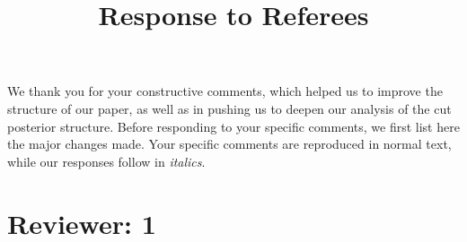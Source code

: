 \documentclass[a4paper,11pt]{article}
\begin{document}
\title{Response to Referees}
\maketitle
We thank you for your constructive comments, which helped us to improve the structure of our paper, as well as in pushing us to deepen our analysis of the cut posterior structure. Before responding to your specific comments, we first list here the major changes made. Your specific comments are reproduced in normal text, while our responses follow in \textit{italics}.

\section*{Reviewer: 1}
\end{document}
